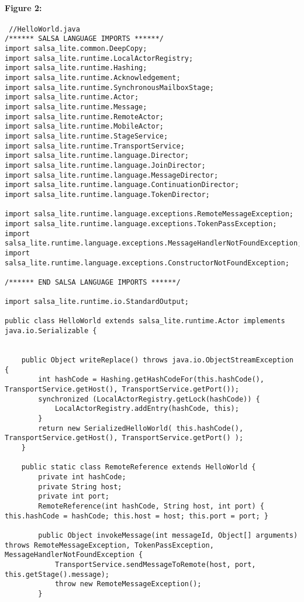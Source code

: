 \documentclass[12pt]{article}
\begin{document}
 \paragraph{Figure 2:\hfill}
\noindent
 \begin{lstlisting}
 //HelloWorld.java
/****** SALSA LANGUAGE IMPORTS ******/
import salsa_lite.common.DeepCopy;
import salsa_lite.runtime.LocalActorRegistry;
import salsa_lite.runtime.Hashing;
import salsa_lite.runtime.Acknowledgement;
import salsa_lite.runtime.SynchronousMailboxStage;
import salsa_lite.runtime.Actor;
import salsa_lite.runtime.Message;
import salsa_lite.runtime.RemoteActor;
import salsa_lite.runtime.MobileActor;
import salsa_lite.runtime.StageService;
import salsa_lite.runtime.TransportService;
import salsa_lite.runtime.language.Director;
import salsa_lite.runtime.language.JoinDirector;
import salsa_lite.runtime.language.MessageDirector;
import salsa_lite.runtime.language.ContinuationDirector;
import salsa_lite.runtime.language.TokenDirector;

import salsa_lite.runtime.language.exceptions.RemoteMessageException;
import salsa_lite.runtime.language.exceptions.TokenPassException;
import salsa_lite.runtime.language.exceptions.MessageHandlerNotFoundException;
import salsa_lite.runtime.language.exceptions.ConstructorNotFoundException;

/****** END SALSA LANGUAGE IMPORTS ******/

import salsa_lite.runtime.io.StandardOutput;

public class HelloWorld extends salsa_lite.runtime.Actor implements java.io.Serializable {


    public Object writeReplace() throws java.io.ObjectStreamException {
        int hashCode = Hashing.getHashCodeFor(this.hashCode(), TransportService.getHost(), TransportService.getPort());
        synchronized (LocalActorRegistry.getLock(hashCode)) {
            LocalActorRegistry.addEntry(hashCode, this);
        }
        return new SerializedHelloWorld( this.hashCode(), TransportService.getHost(), TransportService.getPort() );
    }

    public static class RemoteReference extends HelloWorld {
        private int hashCode;
        private String host;
        private int port;
        RemoteReference(int hashCode, String host, int port) { this.hashCode = hashCode; this.host = host; this.port = port; }

        public Object invokeMessage(int messageId, Object[] arguments) throws RemoteMessageException, TokenPassException, MessageHandlerNotFoundException {
            TransportService.sendMessageToRemote(host, port, this.getStage().message);
            throw new RemoteMessageException();
        }


\end{lstlisting}
\end{document}

